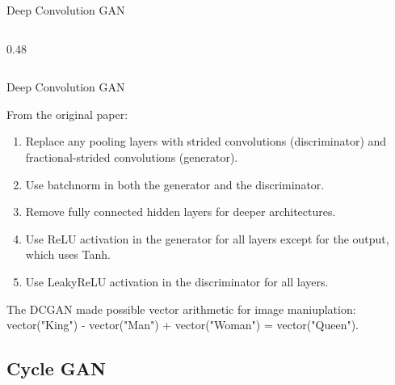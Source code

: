 \documentclass[aspectratio=169,xcolor=dvipsnames,svgnames,x11names,fleqn]{beamer}
\begin{document}
\begin{frame}{Deep Convolution GAN}
\begin{columns}[t]
\begin{column}{0.48\textwidth}
    \end{column}
\end{columns}



\end{frame}

\begin{frame}{Deep Convolution GAN}

From the original paper:

\begin{enumerate}
\item  Replace any pooling layers with strided convolutions (discriminator) and fractional-strided convolutions (generator).
\item Use batchnorm in both the generator and the discriminator.
\item Remove fully connected hidden layers for deeper architectures.
\item Use ReLU activation in the generator for all layers except for the output, which uses Tanh.
\item  Use LeakyReLU activation in the discriminator for all layers.
\end{enumerate}

\vspace{10pt}

\begin{block}{}
The DCGAN made possible vector arithmetic for image maniuplation: vector("King") - vector("Man") + vector("Woman") = vector("Queen").
\end{block}


\end{frame}

\subsection{Cycle GAN}

\begin{frame}
    \subsectionpage
\end{frame}
\end{document}
